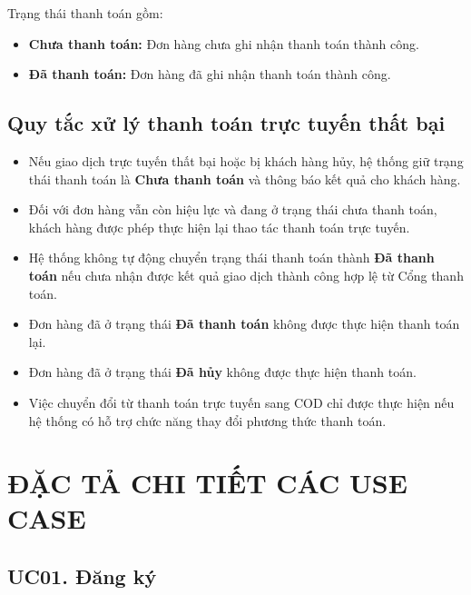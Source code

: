 \documentclass[12pt,a4paper]{article}
\begin{document}
Trạng thái thanh toán gồm:

\begin{itemize}
    \item \textbf{Chưa thanh toán:} Đơn hàng chưa ghi nhận thanh toán thành công.
    \item \textbf{Đã thanh toán:} Đơn hàng đã ghi nhận thanh toán thành công.
\end{itemize}

\subsection{Quy tắc xử lý thanh toán trực tuyến thất bại}

\begin{itemize}
    \item Nếu giao dịch trực tuyến thất bại hoặc bị khách hàng hủy, hệ thống giữ trạng thái thanh toán là \textbf{Chưa thanh toán} và thông báo kết quả cho khách hàng.

    \item Đối với đơn hàng vẫn còn hiệu lực và đang ở trạng thái chưa thanh toán, khách hàng được phép thực hiện lại thao tác thanh toán trực tuyến.

    \item Hệ thống không tự động chuyển trạng thái thanh toán thành \textbf{Đã thanh toán} nếu chưa nhận được kết quả giao dịch thành công hợp lệ từ Cổng thanh toán.

    \item Đơn hàng đã ở trạng thái \textbf{Đã thanh toán} không được thực hiện thanh toán lại.

    \item Đơn hàng đã ở trạng thái \textbf{Đã hủy} không được thực hiện thanh toán.

    \item Việc chuyển đổi từ thanh toán trực tuyến sang COD chỉ được thực hiện nếu hệ thống có hỗ trợ chức năng thay đổi phương thức thanh toán.
\end{itemize}

\section{ĐẶC TẢ CHI TIẾT CÁC USE CASE}


\subsection{UC01. Đăng ký}
\end{document}
